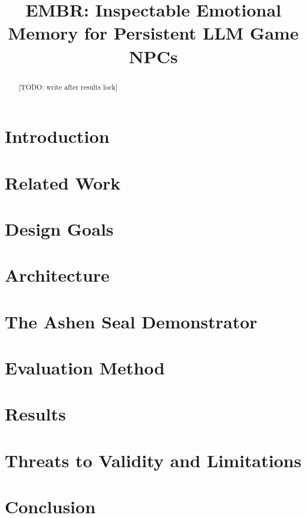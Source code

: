\documentclass[sigconf]{acmart}  %
\title{EMBR: Inspectable Emotional Memory for Persistent LLM Game NPCs}
\begin{document}
\begin{abstract}
[TODO: write after results lock]
\end{abstract}

\maketitle

\section{Introduction}            %
\section{Related Work}            %
\section{Design Goals}            %
\section{Architecture}            %
\section{The Ashen Seal Demonstrator} %
\section{Evaluation Method}       %
\section{Results}                 %
\section{Threats to Validity and Limitations} %
\section{Conclusion}



\end{document}
